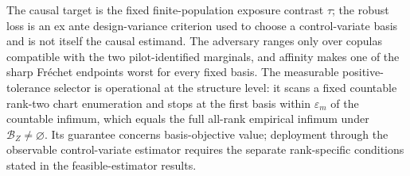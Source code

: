 The causal target is the fixed finite-population exposure contrast \(\tau\); the robust loss is an ex ante design-variance criterion used to choose a control-variate basis and is not itself the causal estimand.  The adversary ranges only over copulas compatible with the two pilot-identified marginals, and affinity makes one of the sharp Fr\'echet endpoints worst for every fixed basis.  The measurable positive-tolerance selector is operational at the structure level: it scans a fixed countable rank-two chart enumeration and stops at the first basis within \(\varepsilon_m\) of the countable infimum, which equals the full all-rank empirical infimum under \(\mathcal B_Z\ne\varnothing\).  Its guarantee concerns basis-objective value; deployment through the observable control-variate estimator requires the separate rank-specific conditions stated in the feasible-estimator results.